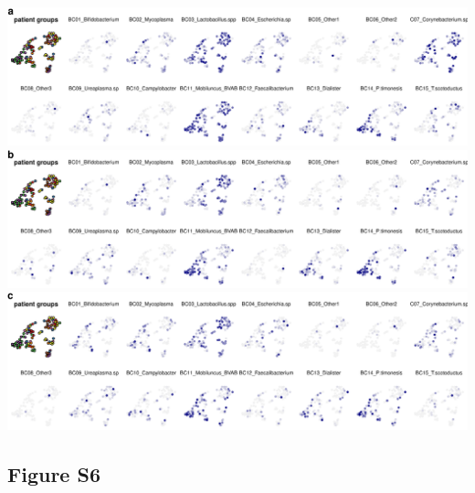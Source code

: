 \documentclass[
]{article}
\begin{document}
\includegraphics[width=1\linewidth]{manuscript_template_files/figure-latex/unnamed-chunk-12-1}
\includegraphics[width=1\linewidth]{manuscript_template_files/figure-latex/unnamed-chunk-12-2}
\includegraphics[width=1\linewidth]{manuscript_template_files/figure-latex/unnamed-chunk-12-3}

\clearpage

\hypertarget{figure-s6}{%
\subsection{Figure S6}\label{figure-s6}}
\end{document}
